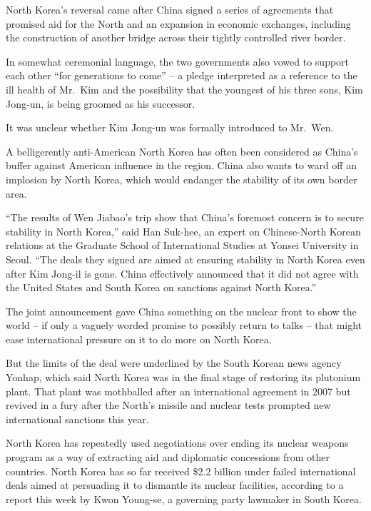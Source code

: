 ﻿\documentclass[12pt]{article}
\begin{document}
North Korea's reversal came after China signed a series of agreements that promised aid for the
North and an expansion in economic exchanges, including the construction of another bridge across
their tightly controlled river border.

In somewhat ceremonial language, the two governments also vowed to support each other ``for
generations to come'' -- a pledge\cite{pledge} interpreted as a reference to the ill health of
Mr.~Kim and the possibility that the youngest of his three sons, Kim Jong-un, is being groomed as
his successor.

It was unclear whether Kim Jong-un was formally introduced to Mr.~Wen.

A belligerently anti-American North Korea has often been considered as China's buffer against
American influence in the region. China also wants to ward off an implosion by North Korea, which
would endanger the stability of its own border area.

``The results of Wen Jiabao's trip show that China's foremost concern is to secure stability in
North Korea,'' said Han Suk-hee, an expert on Chinese-North Korean relations at the Graduate School
of International Studies at Yonsei University in Seoul. ``The deals they signed are aimed at
ensuring stability in North Korea even after Kim Jong-il is gone. China effectively announced that
it did not agree with the United States and South Korea on sanctions against North Korea.''

The joint announcement gave China something on the nuclear front to show the world -- if only a
vaguely worded promise to possibly return to talks -- that might ease international pressure on it
to do more on North Korea.

But the limits of the deal were underlined by the South Korean news agency Yonhap, which said North
Korea was in the final stage of restoring its plutonium plant. That plant was mothballed after an
international agreement in 2007 but revived in a fury after the North's missile and nuclear tests
prompted new international sanctions this year.

North Korea has repeatedly used negotiations over ending its nuclear weapons program as a way of
extracting aid and diplomatic concessions from other countries. North Korea has so far received
\$2.2 billion under failed international deals aimed at persuading it to dismantle its nuclear
facilities, according to a report this week by Kwon Young-se, a governing party lawmaker in South
Korea.
\end{document}
